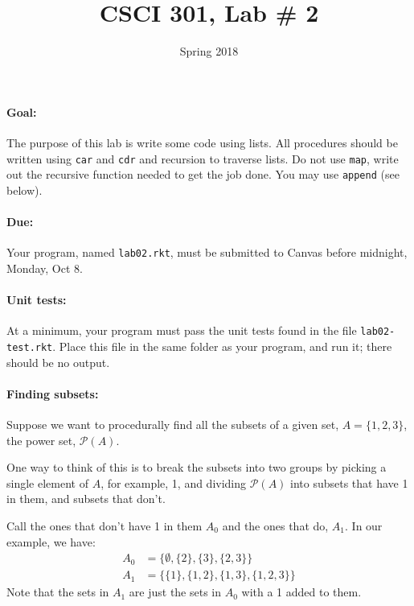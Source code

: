 \documentclass{article}
\title{CSCI 301, Lab \# 2}
\author{Spring 2018}
\date{}
\newcommand{\set}[1]{\ensuremath{\{#1\}}}
\newcommand{\power}[1]{\ensuremath{\mathcal{P}(#1)}}
\begin{document}
\maketitle


\paragraph{Goal:} The purpose of this lab is write some  code 
 using lists.  All procedures should be written using {\tt car} and
 {\tt cdr} and recursion to traverse lists.  Do not use {\tt map},
 write out the recursive function needed to get the job done.  You may
 use {\tt append} (see below).

\paragraph{Due:} Your program, named {\tt lab02.rkt}, must be submitted to
  Canvas before midnight, Monday, Oct 8.

  \paragraph{Unit tests:}
  At a minimum, your program must pass the unit tests found in the
  file {\tt lab02-test.rkt}.  Place this file in the same folder
  as your program, and run it;  there should be no output.

\paragraph{Finding subsets:}  Suppose we want to procedurally find all
the subsets of a given set, $A=\set{1,2,3}$, the power set,
$\mathcal{P}(A)$.

One way to think of this is to break the subsets
into two groups by picking a single element of $A$, for example, 1,
and dividing \power{A} into subsets that have 1 in them, and subsets that
don't.

Call the ones that don't have 1 in them $A_0$ and the ones
that do, $A_1$.  In our example, we have:
\begin{align*}
A_0 &= \set{\emptyset,\set{2},\set{3},\set{2,3}}\\
A_1 &= \set{\set{1},\set{1,2},\set{1,3},\set{1,2,3}}
\end{align*}
Note that the sets in $A_1$ are just the sets in $A_0$ with a 1 added
to them.
\end{document}
